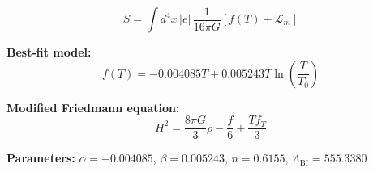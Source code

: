 
\begin{equation}
  S = \int d^4x \, |e| \, \frac{1}{16\pi G} \left[ f(T) + \mathcal{L}_m \right]
\end{equation}

\textbf{Best-fit model:}
\begin{equation}
  f(T) = -0.004085 T + 0.005243 T \ln\!\left(\frac{T}{T_0}\right)
\end{equation}

\textbf{Modified Friedmann equation:}
\begin{equation}
  H^2 = \frac{8\pi G}{3} \rho - \frac{f}{6} + \frac{T f_T}{3}
\end{equation}

\textbf{Parameters:}
$\alpha = -0.004085$, \quad
$\beta = 0.005243$, \quad
$n = 0.6155$, \quad
$\Lambda_{\text{BI}} = 555.3380$